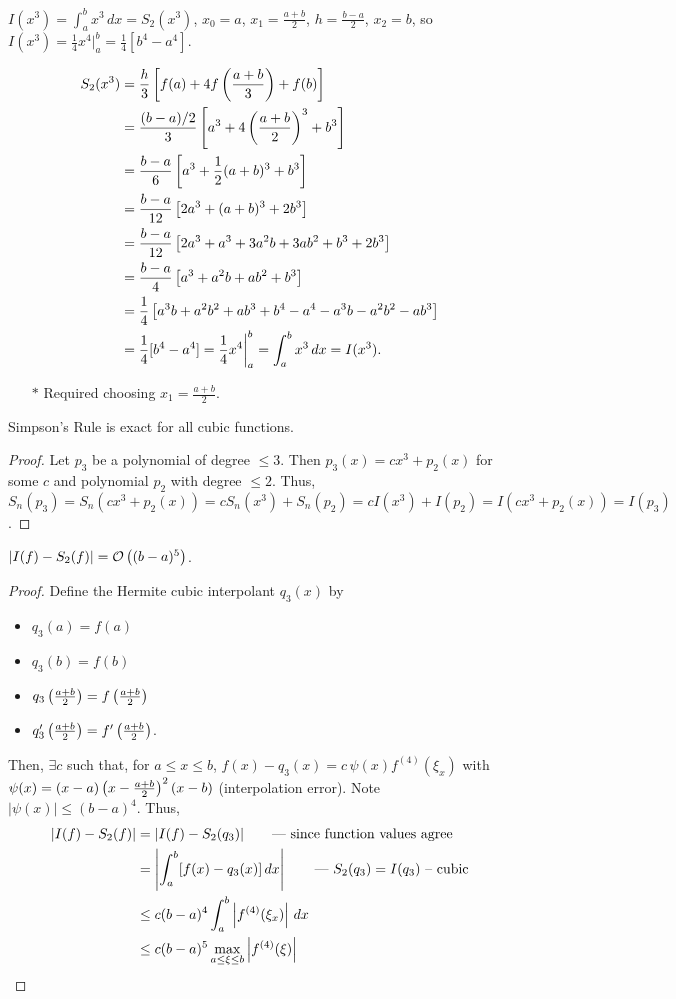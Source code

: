 \documentclass[]{article}
\begin{document}
\begin{observe}
	$I(x^3) = \int_a^b x^3\,dx = S_2(x^3)$, $x_0=a$, $x_1 = \frac{a+b}2$, $h=\frac{b-a}2$, $x_2=b$, so $I(x^3) = \frac14 x^4\big|_a^b = \frac14[b^4-a^4]$.
\end{observe}
\begin{align*}
	S_2(x^3) &= \frac h3\left[ f(a)+4f\left(\frac{a+b}3\right)+f(b)\right] \\
			 &= \frac{(b-a)/2}3\left[a^3+4\left(\frac{a+b}2\right)^3+b^3\right] \\
			 &= \frac{b-a}6 \left[a^3+\frac12(a+b)^3+b^3\right] \\
			 &= \frac{b-a}{12} \left[2a^3+(a+b)^3+2b^3\right] \\
			 &= \frac{b-a}{12} \left[2a^3+a^3+3a^2b+3ab^2+b^3+2b^3\right] \\
			 &= \frac{b-a}4 \left[a^3+a^2b+ab^2+b^3\right] \\
			 &= \frac14\left[a^3b+a^2b^2+ab^3+b^4-a^4-a^3b-a^2b^2-ab^3\right] \\
			 &= \frac14[b^4-a^4] = \frac14x^4\bigg|_a^b = \int_a^b x^3\,dx = I(x^3).
\end{align*}
\begin{enumerate}
	\item[$*$] Required choosing $x_1 = \frac{a+b}2$.
\end{enumerate}
\begin{theorem}
	Simpson's Rule is exact for all cubic functions.
\end{theorem}
\begin{proof}
	Let $p_3$ be a polynomial of degree $\leq 3$.
	Then $p_3(x) = cx^3 + p_2(x)$ for some $c$ and polynomial $p_2$ with degree $\leq 2$.
	Thus, $S_n(p_3) = S_n(cx^3+p_2(x)) = c S_n(x^3) + S_n(p_2) = cI(x^3)+I(p_2) = I(cx^3+p_2(x)) = I(p_3)$.
\end{proof}
\begin{theorem}
	$|I(f)-S_2(f)| = \mathcal{O}\left((b-a)^5\right)$.
\end{theorem}
\begin{proof}
	Define the Hermite cubic interpolant $q_3(x)$ by
	\begin{itemize}
		\item $q_3(a) = f(a)$
		\item $q_3(b) = f(b)$
		\item $q_3\left(\frac{a+b}2\right) = f\left(\frac{a+b}2\right)$
		\item $q_3'\left(\frac{a+b}2\right) = f'\left(\frac{a+b}2\right)$.
	\end{itemize}
	Then, $\exists c$ such that, for $a\leq x\leq b$, 
	$f(x)-q_3(x) = c\,\psi(x)f^{(4)}(\xi_x)$ with $\psi(x) = (x-a)\left(x-\frac{a+b}2\right)^2(x-b)$ (interpolation error).
	Note $|\psi(x)|\leq (b-a)^4$.
	Thus,
	\begin{align*}
		|I(f)-S_2(f)| &= |I(f)-S_2(q_3)| \qquad \text{--- since function values agree}\\
					  &= \left|\int_a^b [f(x)-q_3(x)]\,dx\right| \qquad \text{--- } S_2(q_3)=I(q_3) \text{ -- cubic} \\
					  &\leq c(b-a)^4 \int_a^b \left|f^{(4)}(\xi_x)\right|\,dx \\
					  &\leq c(b-a)^5 \max_{a\leq\xi\leq b} \left|f^{(4)}(\xi)\right|
	\end{align*}
\end{proof}
\end{document}

